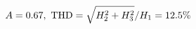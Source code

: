 \documentclass[preview]{standalone}
\begin{document}
\begin{align*}
\special{dvisvgm:raw <g id='unique000'>}A=0.67,\ \text{THD}=\sqrt{H_2^2+H_3^2}/H_1=12.5\%\special{dvisvgm:raw </g>}
\end{align*}
\end{document}
